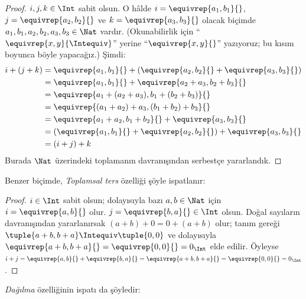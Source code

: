 \begin{proof}
$i, j, k \in \Int$ sabit olsun. O hâlde $i = \equivrep{a_1, b_1}{}$,
$j = \equivrep{a_2,b_2}{}$ ve $k = \equivrep{a_3, b_3}{}$ olacak biçimde
$a_1, b_1, a_2, b_2, a_3, b_3 \in \Nat$ vardır. (Okunabilirlik için
“$\equivrep{x, y}{\Intequiv}$” yerine “$\equivrep{x, y}{}$” yazıyoruz;
bu kısım boyunca böyle yapacağız.) Şimdi:
\begin{align*}
	i + (j + k) &= \equivrep{a_1, b_1}{}+(\equivrep{a_2, b_2}{} + \equivrep{a_3, b_3}{}) \\
	&= \equivrep{a_1,  b_1}{} + \equivrep{a_2+a_3, b_2+b_3}{}\\
	&= \equivrep{a_1 + (a_2 + a_3), b_1 + (b_2 + b_3)}{}\\
	&= \equivrep{(a_1 + a_2) + a_3, (b_1 + b_2) + b_3}{}\\
	&= \equivrep{a_1 + a_2, b_1 + b_2}{} + \equivrep{a_3, b_3}{}\\
	&= (\equivrep{a_1, b_1}{} + \equivrep{a_2, b_2}{}) + \equivrep{a_3, b_3}{}\\
	&= (i+j) + k
\end{align*}
Burada $\Nat$ üzerindeki toplamanın davranışından serbestçe yararlandık.
\end{proof}

Benzer biçimde, \emph{Toplamsal ters} özelliği şöyle ispatlanır:

\begin{proof}
$i \in \Int$ sabit olsun; dolayısıyla bazı $a,b \in \Nat$ için
$i = \equivrep{a,b}{}$ olur. $j = \equivrep{b,a}{} \in \Int$ olsun.
Doğal sayıların davranışından yararlanırsak $(a+b) + 0 = 0 + (a+b)$ olur;
tanım gereği $\tuple{a+b, b+a} \Intequiv \tuple{0,0}$ ve dolayısıyla
$\equivrep{a+b, b+a}{} = \equivrep{0, 0}{} = 0_\Int$ elde edilir. Öyleyse
$i + j = \equivrep{a,b}{}+\equivrep{b,a}{}=\equivrep{a+b, b+a}{}
= \equivrep{0, 0}{} = 0_\Int$.
\end{proof}

\emph{Dağılma} özelliğinin ispatı da şöyledir:


